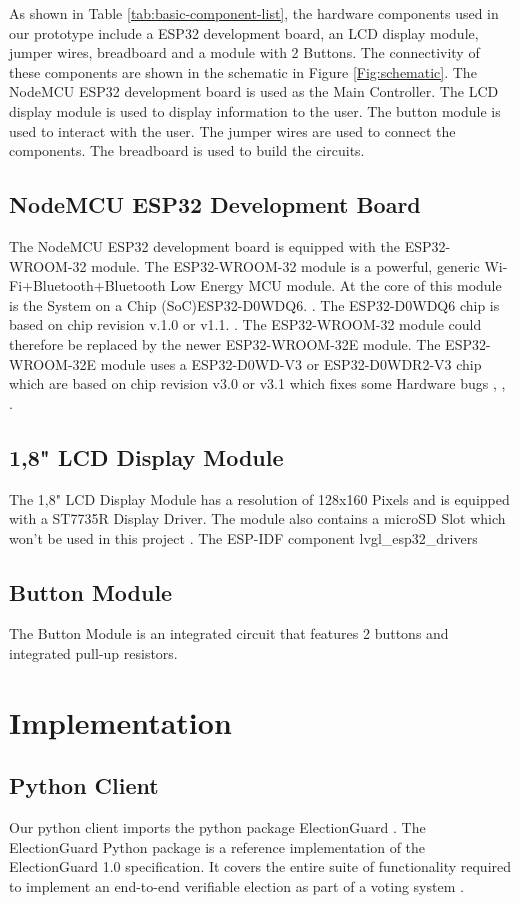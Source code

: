 As shown in Table \ref{tab:basic-component-list}, the hardware components used in our prototype include a ESP32 development board, an LCD display module, jumper wires, breadboard and a module with 2 Buttons. The connectivity of these components are shown in the schematic in Figure \ref{Fig:schematic}. The NodeMCU ESP32 development board is used as the Main Controller. The LCD display module is used to display information to the user. The button module is used to interact with the user. The jumper wires are used to connect the components. The breadboard is used to build the circuits.

\subsection{NodeMCU ESP32 Development Board}
The NodeMCU ESP32 development board is equipped with the ESP32-WROOM-32 module. The ESP32-WROOM-32 module is a powerful, generic Wi-Fi+Bluetooth+Bluetooth Low Energy MCU module. At the core of this module is the System on a Chip (SoC)ESP32-D0WDQ6. \cite[6]{esp32-module}. The ESP32-D0WDQ6 chip is based on chip revision v.1.0 or v1.1. \cite[11]{esp32-ds}. The ESP32-WROOM-32 module could therefore be replaced by the newer ESP32-WROOM-32E module. The ESP32-WROOM-32E module uses a ESP32-D0WD-V3 or ESP32-D0WDR2-V3 chip which are based on chip revision v3.0 or v3.1 which fixes some Hardware bugs \cite[1]{esp32-module-new}, \cite[11]{esp32-ds}, \cite[3-4]{esp32-errata}. 

\subsection{1,8" LCD Display Module}
The 1,8" LCD Display Module has a resolution of 128x160 Pixels and is equipped with a ST7735R Display Driver.  The module also contains a microSD Slot which won't be used in this project \cite[2]{lcd}.
The ESP-IDF component lvgl_esp32_drivers


\subsection{Button Module}
The Button Module is an integrated circuit that features 2 buttons and integrated pull-up resistors. \cite[1]{button-ds}


\section{Implementation}
\subsection{Python Client}
Our python client imports the python package ElectionGuard \cite{python-reference}. The ElectionGuard Python package is a reference implementation of the ElectionGuard 1.0 specification. It covers the entire suite of functionality required to implement an end-to-end verifiable election as part of a voting system \cite{eg-docs}. 



